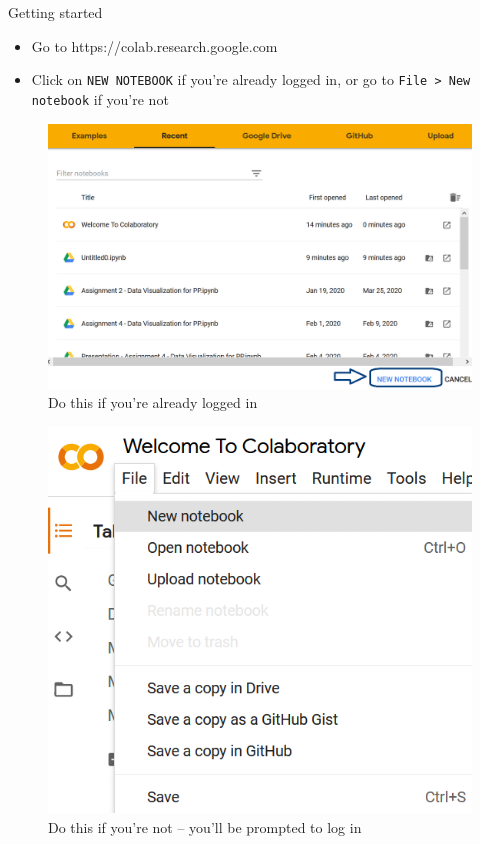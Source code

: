 \documentclass[aspectratio=169]{beamer}
\begin{document}
\begin{frame}{Getting started}

	\begin{itemize}
		\item Go to https://colab.research.google.com
		\item Click on \texttt{NEW NOTEBOOK} if you're already logged in, or go to \texttt{File > New notebook} if you're not
	\end{itemize}

	\begin{multicols}{2}

		\begin{figure}
			\centering
			\includegraphics[width=0.9\linewidth]{img/new_nb_logged_in.png}
			\caption{Do this if you're already logged in}
		\end{figure}
		\begin{figure}
			\centering
			\includegraphics[width=0.6\linewidth]{img/new_nb_not_logged_in.png}
			\caption{Do this if you're not -- you'll be prompted to log in}
		\end{figure}

	\end{multicols}

\end{frame}
\end{document}
